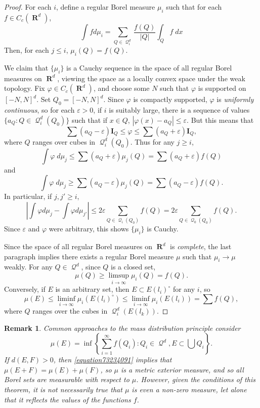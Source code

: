 \documentclass{article}
\DeclareMathOperator{\RR}{\mathbf{R}}
\DeclareMathOperator{\DQ}{\mathcal{Q}}
\theoremstyle{plain}
\newtheorem*{remark}{Remark}
\begin{document}
\begin{proof}
    For each $i$, define a regular Borel measure $\mu_i$ such that for each $f \in C_c(\RR^d)$,
    \[ \int f d\mu_i = \sum_{Q \in \DQ_i^d} \frac{f(Q)}{|Q|} \int_Q f\; dx \]
    Then, for each $j \leq i$, $\mu_i(Q) = f(Q)$.

    We claim that $\{ \mu_i \}$ is a Cauchy sequence in the space of all regular Borel measures on $\RR^d$, viewing the space as a locally convex space under the weak topology. Fix $\varphi \in C_c(\RR^d)$, and choose some $N$ such that $\varphi$ is supported on $[-N,N]^d$. Set $Q_0 = [-N,N]^d$. Since $\varphi$ is compactly supported, $\varphi$ is \emph{uniformly continuous}, so for each $\varepsilon > 0$, if $i$ is suitably large, there is a sequence of values $\{ a_Q : Q \in \DQ_i^d(Q_0) \}$ such that if $x \in Q$, $|\varphi(x) - a_Q| \leq \varepsilon$. But this means that
    \[ \sum (a_Q - \varepsilon) \mathbf{I}_Q \leq \varphi \leq \sum (a_Q + \varepsilon) \mathbf{I}_Q, \]
    where $Q$ ranges over cubes in $\DQ_i^d(Q_0)$. Thus for any $j \geq i$,
    \[ \int \varphi\; d\mu_j\leq \sum (a_Q + \varepsilon) \mu_j(Q) = \sum (a_Q + \varepsilon) f(Q) \]
    and
    \[ \int \varphi\; d\mu_j \geq \sum (a_Q - \varepsilon) \mu_j(Q) = \sum (a_Q - \varepsilon) f(Q). \]
    In particular, if $j,j' \geq i$,
    \[ \left| \int \varphi d\mu_j - \int \varphi d\mu_{j'} \right| \leq 2 \varepsilon \sum_{Q \in \DQ_i(Q_0)} f(Q) = 2\varepsilon \sum_{Q \in \DQ_0(Q_0)} f(Q). \]
    Since $\varepsilon$ and $\varphi$ were arbitrary, this shows $\{ \mu_i \}$ is Cauchy.

    Since the space of all regular Borel measures on $\RR^d$ is \emph{complete}, the last paragraph implies there exists a regular Borel measure $\mu$ such that $\mu_i \to \mu$ weakly. For any $Q \in \DQ^d$, since $Q$ is a closed set,
    \[ \mu(Q) \geq \limsup_{i \to \infty} \mu_i(Q) = f(Q). \]
    Conversely, if $E$ is an arbitrary set, then $E \subset E(l_i)^\circ$ for any $i$, so
    \[ \mu(E) \leq \liminf_{i \to \infty} \mu_i(E(l_i)^\circ) \leq \liminf_{i \to \infty} \mu_i(E(l_i)) = \sum f(Q), \]
    where $Q$ ranges over the cubes in $\DQ_i^d(E(l_k))$.
\end{proof}

\begin{remark}
    Common approaches to the mass distribution principle consider
    \[ \mu(E) = \inf \left\{ \sum_{i = 1}^\infty f(Q_i) : Q_i \in \DQ^d, E \subset \bigcup Q_i \right\}. \]
    If $d(E,F) > 0$, then \eqref{equation73234091} implies that $\mu(E + F) = \mu(E) + \mu(F)$, so $\mu$ is a metric exterior measure, and so all Borel sets are measurable with respect to $\mu$. However, given the conditions of this theorem, it is \emph{not} necessarily true that $\mu$ is even a non-zero measure, let alone that it reflects the values of the functions $f$.
\end{remark}
\end{document}
